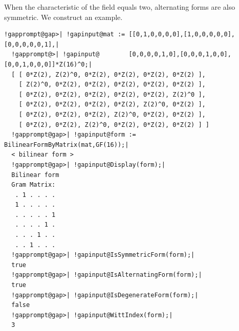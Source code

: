 \documentclass[a4paper,11pt]{report}
\begin{document}
{{{\begin{Verbatim}[commandchars=!@|,fontsize=\small,frame=single,label=Example]
\end{Verbatim}
 When the characteristic of the field equals two, alternating forms are also
symmetric. We construct an example. 
\begin{Verbatim}[commandchars=!@|,fontsize=\small,frame=single,label=Example]
  !gapprompt@gap>| !gapinput@mat := [[0,1,0,0,0,0],[1,0,0,0,0,0],[0,0,0,0,0,1],|
  !gapprompt@>| !gapinput@        [0,0,0,0,1,0],[0,0,0,1,0,0],[0,0,1,0,0,0]]*Z(16)^0;|
  [ [ 0*Z(2), Z(2)^0, 0*Z(2), 0*Z(2), 0*Z(2), 0*Z(2) ], 
    [ Z(2)^0, 0*Z(2), 0*Z(2), 0*Z(2), 0*Z(2), 0*Z(2) ], 
    [ 0*Z(2), 0*Z(2), 0*Z(2), 0*Z(2), 0*Z(2), Z(2)^0 ], 
    [ 0*Z(2), 0*Z(2), 0*Z(2), 0*Z(2), Z(2)^0, 0*Z(2) ], 
    [ 0*Z(2), 0*Z(2), 0*Z(2), Z(2)^0, 0*Z(2), 0*Z(2) ], 
    [ 0*Z(2), 0*Z(2), Z(2)^0, 0*Z(2), 0*Z(2), 0*Z(2) ] ]
  !gapprompt@gap>| !gapinput@form := BilinearFormByMatrix(mat,GF(16));|
  < bilinear form >
  !gapprompt@gap>| !gapinput@Display(form);|
  Bilinear form
  Gram Matrix:
   . 1 . . . .
   1 . . . . .
   . . . . . 1
   . . . . 1 .
   . . . 1 . .
   . . 1 . . .
  !gapprompt@gap>| !gapinput@IsSymmetricForm(form);|
  true
  !gapprompt@gap>| !gapinput@IsAlternatingForm(form);|
  true
  !gapprompt@gap>| !gapinput@IsDegenerateForm(form);|
  false
  !gapprompt@gap>| !gapinput@WittIndex(form);|
  3
   

\end{Verbatim}}}}
\end{document}
